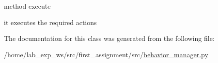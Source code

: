 method execute 

it executes the required actions 

The documentation for this class was generated from the following file\+:\begin{DoxyCompactItemize}
\item 
/home/lab\+\_\+exp\+\_\+ws/src/first\+\_\+assignment/src/\hyperlink{behavior__manager_8py}{behavior\+\_\+manager.\+py}\end{DoxyCompactItemize}
